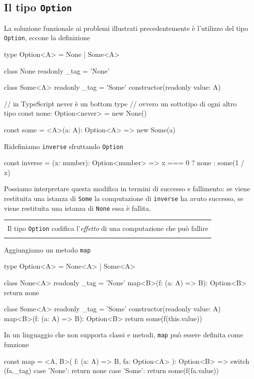\documentclass[12pt]{article}
\theoremstyle{definition}
\newenvironment{demo}
    {\begin{center}
    \begin{tabular}{|p{0.9\textwidth}|}
    \hline\\
    }
    {
    \\\\\hline
    \end{tabular}
    \end{center}
    }
\newenvironment{code}
  {\vspace{0.5cm} \VerbatimEnvironment\begin{typescriptcode}}
  {\end{typescriptcode} \vspace{0.2cm}}
\begin{document}
\subsection{Il tipo \texttt{Option}}

La soluzione funzionale ai problemi illustrati precedentemente è l'utilizzo del tipo \texttt{Option},
eccone la definizione

\begin{code}
type Option<A> = None | Some<A>

class None {
  readonly _tag = 'None'
}

class Some<A> {
  readonly _tag = 'Some'
  constructor(readonly value: A) {}
}

// in TypeScript never è un bottom type
// ovvero un sottotipo di ogni altro tipo
const none: Option<never> = new None()

const some = <A>(a: A): Option<A> => new Some(a)
\end{code}

Ridefiniamo \texttt{inverse} sfruttando \texttt{Option}

\begin{code}
const inverse = (x: number): Option<number> =>
  x === 0 ? none : some(1 / x)
\end{code}

Possiamo interpretare questa modifica in termini di successo e fallimento: se viene restituita una istanza di \texttt{Some}
la computazione di \texttt{inverse} ha avuto successo, se viene restituita una istanza di \texttt{None} essa è fallita.

\begin{demo}
Il tipo \texttt{Option} codifica l'\emph{effetto} di una computazione che può fallire
\end{demo}

Aggiungiamo un metodo \texttt{map}

\begin{code}
type Option<A> = None<A> | Some<A>

class None<A> {
  readonly _tag = 'None'
  map<B>(f: (a: A) => B): Option<B> {
    return none
  }
}

class Some<A> {
  readonly _tag = 'Some'
  constructor(readonly value: A) {}
  map<B>(f: (a: A) => B): Option<B> {
    return some(f(this.value))
  }
}
\end{code}

In un linguaggio che non supporta classi e metodi, \texttt{map} può essere definita come funzione

\begin{code}
const map = <A, B>(
  f: (a: A) => B,
  fa: Option<A>
): Option<B> => {
  switch (fa._tag) {
    case 'None':
      return none
    case 'Some':
      return some(f(fa.value))
  }
}
\end{code}
\end{document}
